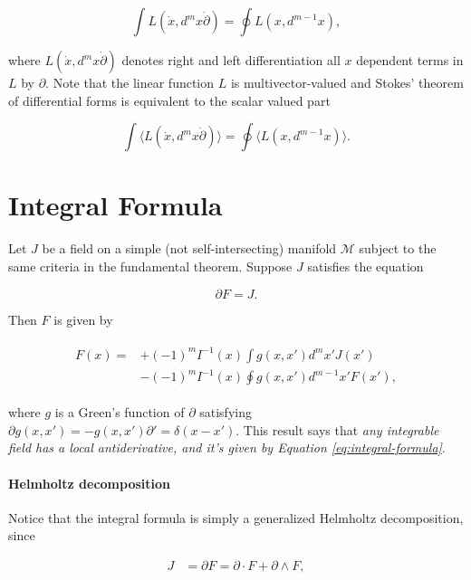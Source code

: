 \documentclass[twocolumn]{article}
\begin{document}
\begin{equation}
  \int L(\dot x, d^mx \dot \partial) = \oint L(x, d^{m-1}x),\label{eq:fundamental-theorem}
\end{equation}

where $L(\dot x, d^mx \dot \partial)$ denotes right and left differentiation all $x$ dependent terms in $L$ by $\partial$. Note that the linear function $L$ is multivector-valued and Stokes' theorem of differential forms is equivalent to the scalar valued part

\begin{equation}
  \int \langle L(\dot x, d^mx \dot \partial)\rangle = \oint \langle L(x, d^{m-1}x)\rangle.
\end{equation}

\section{Integral Formula}

Let $J$ be a field on a simple (not self-intersecting) manifold $\mathcal{M}$ subject to the same criteria in the fundamental theorem. Suppose $J$ satisfies the equation

\begin{equation}
  \partial F = J.
\end{equation}

Then $F$ is given by \cite{cagc}

\begin{align}
  \begin{split}
    F(x) = & +(-1)^{m} I^{-1}(x) \int g(x, x') d^{m}x' J(x') \\
    &- (-1)^{m} I^{-1}(x) \oint g(x, x') d^{m-1}x' F(x'),\label{eq:integral-formula}
  \end{split}
\end{align}

where $g$ is a Green's function of $\partial$ satisfying $\partial g(x,x') = - g(x, x') \partial' = \delta(x - x').$ This result says that \emph{any integrable field has a local antiderivative, and it's given by Equation \ref{eq:integral-formula}}.

\paragraph{Helmholtz decomposition}

Notice that the integral formula is simply a generalized Helmholtz decomposition, since

\begin{align}
    J &= \partial F = \partial \cdot F + \partial \wedge F, \label{eq:helmholtz}
  \end{align}
\end{document}
